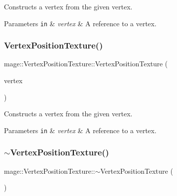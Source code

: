 Constructs a vertex from the given vertex.


\begin{DoxyParams}[1]{Parameters}
\mbox{\tt in}  & {\em vertex} & A reference to a vertex. \\
\hline
\end{DoxyParams}
\hypertarget{structmage_1_1_vertex_position_texture_ae15ab647b9ed9e2c3c769b283eb00b12}{}\label{structmage_1_1_vertex_position_texture_ae15ab647b9ed9e2c3c769b283eb00b12} 
\subsubsection{\texorpdfstring{Vertex\+Position\+Texture()}{VertexPositionTexture()}\hspace{0.1cm}{\footnotesize\ttfamily [4/4]}}
{\footnotesize\ttfamily mage\+::\+Vertex\+Position\+Texture\+::\+Vertex\+Position\+Texture (\begin{DoxyParamCaption}\item[{\hyperlink{structmage_1_1_vertex_position_texture}{Vertex\+Position\+Texture} \&\&}]{vertex }\end{DoxyParamCaption})\hspace{0.3cm}{\ttfamily [default]}}

Constructs a vertex from the given vertex.


\begin{DoxyParams}[1]{Parameters}
\mbox{\tt in}  & {\em vertex} & A reference to a vertex. \\
\hline
\end{DoxyParams}
\hypertarget{structmage_1_1_vertex_position_texture_abafd9b5ff2067834916b522d58b5764f}{}\label{structmage_1_1_vertex_position_texture_abafd9b5ff2067834916b522d58b5764f} 
\subsubsection{\texorpdfstring{$\sim$\+Vertex\+Position\+Texture()}{~VertexPositionTexture()}}
{\footnotesize\ttfamily mage\+::\+Vertex\+Position\+Texture\+::$\sim$\+Vertex\+Position\+Texture (\begin{DoxyParamCaption}{ }\end{DoxyParamCaption})\hspace{0.3cm}{\ttfamily [default]}}

